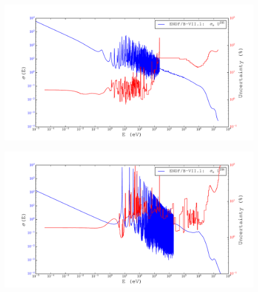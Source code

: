 \documentclass{beamer}
\begin{document}
\begin{frame}
  \begin{figure}[H]
    \begin{center}
      \hspace*{-0.7cm}\includegraphics[width=1.1\columnwidth]{../Weighting/X_Sections/XwVar_U_235_92_a.pdf}
      \vspace{-5mm}
      \label{fig:XU235}
    \end{center}
  \end{figure}
\end{frame}

\begin{frame}
  \begin{figure}[H]
    \begin{center}
      \hspace*{-0.7cm}\includegraphics[width=1.1\columnwidth]{../Weighting/X_Sections/XwVar_U_238_92_a.pdf}
      \vspace{-5mm}
      \label{fig:XU238}
    \end{center}
  \end{figure}
\end{frame}
\end{document}
